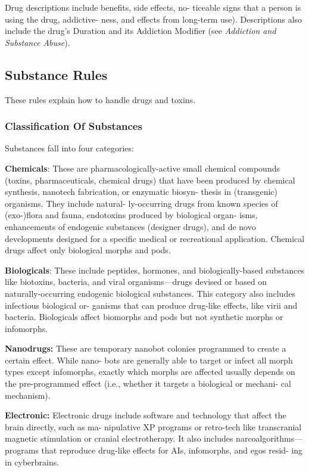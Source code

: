 Drug descriptions include benefits, side effects, no-
ticeable signs that a person is using the drug, addictive-
ness, and effects from long-term use). Descriptions also 
include the drug's Duration and its Addiction Modifier 
(see \textit{Addiction and Substance Abuse}).

\subsection{Substance Rules}

These rules explain how to handle drugs and toxins.

\subsubsection{Classification Of Substances}

Substances fall into four categories:

\textbf{Chemicals}: These are pharmacologically-active 
small chemical compounds (toxins, pharmaceuticals, 
chemical drugs) that have been produced by chemical 
synthesis, nanotech fabrication, or enzymatic biosyn-
thesis in (transgenic) organisms. They include natural-
ly-occurring drugs from known species of (exo-)flora 
and fauna, endotoxins produced by biological organ-
isms, enhancements of endogenic substances (designer 
drugs), and de novo developments designed for a 
specific medical or recreational application. Chemical 
drugs affect only biological morphs and pods.

\textbf{Biologicals}: These include peptides, hormones, and 
biologically-based substances like biotoxins, bacteria, 
and viral organisms—drugs devised or based on 
naturally-occurring endogenic biological substances. 
This category also includes infectious biological or-
ganisms that can produce drug-like effects, like virii 
and bacteria. Biologicals affect biomorphs and pods 
but not synthetic morphs or infomorphs.

\textbf{Nanodrugs: }These are temporary nanobot colonies 
programmed to create a certain effect. While nano-
bots are generally able to target or infect all morph 
types except infomorphs, exactly which morphs are 
affected usually depends on the pre-programmed 
effect (i.e., whether it targets a biological or mechani-
cal mechanism).

\textbf{Electronic: }Electronic drugs include software and 
technology that affect the brain directly, such as ma-
nipulative XP programs or retro-tech like transcranial 
magnetic stimulation or cranial electrotherapy. It also 
includes narcoalgorithms—programs that reproduce 
drug-like effects for AIs, infomorphs, and egos resid-
ing in cyberbrains.

